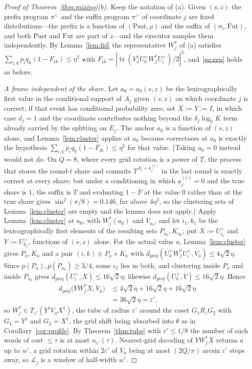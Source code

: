 \documentclass[aps,prx,twocolumn,superscriptaddress,nofootinbib,longbibliography]{revtex4-2}
\theoremstyle{plain}
\theoremstyle{definition}
\theoremstyle{remark}
\newcommand{\dproj}{d_{\mathrm{proj}}}
\newcommand{\tr}{\operatorname{tr}}
\begin{document}
\begin{proof}[Proof of Theorem~\ref{thm:mixing}(b)]
Keep the notation of (a). Given $(s,z)$ the prefix program $\pi^<$ and the suffix program $\pi^>$ of coordinate $j$ are fixed distributions---the prefix is a function of $(\mathrm{Past},\rho)$ and the suffix of $(\sigma_t,\mathrm{Fut})$, and both $\mathrm{Past}$ and $\mathrm{Fut}$ are part of $z$---and the executor samples them independently. By Lemma~\ref{lem:fid} the representative $W^*_j$ of (a) satisfies $\sum_{i,k}p_iq_k(1-F_{ik})\le\eta^2$ with $F_{ik}=|\tr(V_a^\dagger U^>_kW^*_jU^<_i)/2|^2$, and~\eqref{eq:rep} holds as before.

\emph{A frame independent of the share.} Let $a_0=a_0(s,z)$ be the lexicographically first value in the conditional support of $A_j$ given $(s,z)$ on which coordinate $j$ is correct; if that event has conditional probability zero, set $X:=Y:=I$, in which case $d_j=1$ and the coordinate contributes nothing beyond the $\delta_j\log_2K$ term already carried by the splitting on $E_j$. The anchor $a_0$ is a function of $(s,z)$ alone, and Lemma~\ref{lem:cluster} applies at $a_0$ because correctness at $a_0$ is exactly the hypothesis $\sum_{i,k}p_iq_k(1-F_{ik})\le\eta^2$ for that value. (Taking $a_0=0$ instead would not do. On $Q=8$, where every grid rotation is a power of $T$, the process that stores the round-$t$ share and commits $T^{A_j+a^{(r)}_j}$ in the last round is exactly correct at every share; but under a conditioning in which $a^{(r)}_j=0$ and the true share is $1$, the suffix is $T$ and evaluating $1-F$ at the value $0$ rather than at the true share gives $\sin^2(\pi/8)=0.146$, far above $4\eta^2$, so the clustering sets of Lemma~\ref{lem:cluster} are empty and the lemma does not apply.) Apply Lemma~\ref{lem:cluster} at $a_0$, with $W^*_j(a_0)$ and $V_{a_0}$, and let $i_1,k_1$ be the lexicographically first elements of the resulting sets $P_{a_0},K_{a_0}$; put $X:=U^<_{i_1}$ and $Y:=U^>_{k_1}$, functions of $(s,z)$ alone. For the actual value $a$, Lemma~\ref{lem:cluster} gives $P_a,K_a$ and a pair $(i,k)\in P_a\times K_a$ with $\dproj(U^>_kW^*_jU^<_i,V_a)\le4\sqrt2\eta$. Since $p(P_a),p(P_{a_0})\ge3/4$, some $i_2$ lies in both, and clustering inside $P_a$ and inside $P_{a_0}$ gives $\dproj(U^<_i,X)\le16\sqrt2\eta$; likewise $\dproj(U^>_k,Y)\le16\sqrt2\eta$. Hence
\[
\begin{aligned}
\dproj\big(YW^*_jX,V_a\big)&\le4\sqrt2\eta+16\sqrt2\eta+16\sqrt2\eta\\
&=36\sqrt2\eta=\varepsilon',
\end{aligned}
\]
so $W^*_j\in T_{\varepsilon'}(Y^\dagger V_aX^\dagger)$, the tube of radius $\varepsilon'$ around the coset $G_1R_zG_2$ with $G_1=Y^\dagger$ and $G_2=X^\dagger$, the grid shift being absorbed into $\theta$ as in Corollary~\ref{cor:profile}. By Theorem~\ref{thm:tube} with $\varepsilon'\le1/8$ the number of such words of cost $\le\tau$ is at most $n_{\varepsilon'}(\tau)$. Nearest-grid decoding of $YW^*_jX$ returns $a$ up to $w'$, a grid rotation within $2\varepsilon'$ of $V_a$ being at most $(2Q/\pi)\arcsin\varepsilon'$ steps away, so $\mathcal L_j$ is a window of half-width $w'$.


\end{proof}
\end{document}
